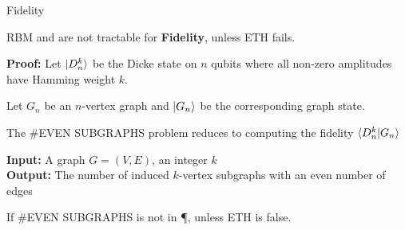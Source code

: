 \begin{refsection}
\begin{frame}{Fidelity}
	\begin{theorem}
		RBM and \limdd are not tractable for \textbf{Fidelity}, unless ETH fails.
	\end{theorem}

\textbf{Proof:}
Let $\ket{D^k_n}$ be the Dicke state on $n$ qubits where all non-zero amplitudes have Hamming weight $k$.

Let $G_n$ be an $n$-vertex graph and $\ket{G_n}$ be the corresponding graph state.

\alert{The \#EVEN SUBGRAPHS problem reduces to computing the fidelity $\braket{D^k_n| G_n}$}


\begin{definition}
	\textbf{Input:} A graph $G=(V,E)$, an integer $k$\\
	\textbf{Output:} The number of induced $k$-vertex subgraphs with an even number of edges
\end{definition}


\begin{theorem}
	\label{thm:even-subgraphs-ETH-hard}
	If \#EVEN SUBGRAPHS is not in \P, unless ETH is false.
\end{theorem}


\printbibliography[section=\therefsection]

\end{frame}
\end{refsection}





